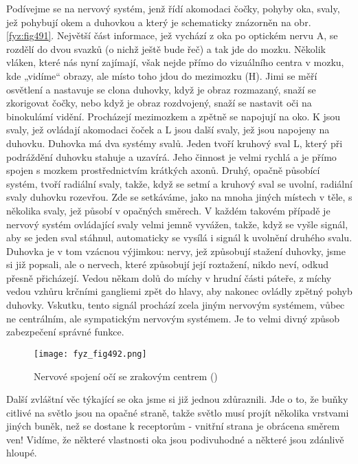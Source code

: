     Podívejme se na nervový systém, jenž řídí akomodaci čočky, pohyby oka, svaly, jež pohybují okem
    a duhovkou a který je schematicky znázorněn na obr. \ref{fyz:fig491}. Největší část informace,
    jež vychází z oka po optickém nervu A, se rozdělí do dvou svazků (o nichž ještě bude řeč) a tak
    jde do mozku. Několik vláken, které nás nyní zajímají, však nejde přímo do vizuálního centra v
    mozku, kde „vidíme“ obrazy, ale místo toho jdou do mezimozku (H). Jimi se měří osvětlení a
    nastavuje se clona duhovky, když je obraz rozmazaný, snaží se zkorigovat čočky, nebo když je
    obraz rozdvojený, snaží se nastavit oči na binokulámí vidění. Procházejí mezimozkem a zpětně se
    napojují na oko. K jsou svaly, jež ovládají akomodaci čoček a L jsou další svaly, jež jsou
    napojeny na duhovku. Duhovka má dva systémy svalů. Jeden tvoří kruhový sval L, který při
    podráždění duhovku stahuje a uzavírá. Jeho činnost je velmi rychlá a je přímo spojen s mozkem
    prostřednictvím krátkých axonů. Druhý, opačně působící systém, tvoří radiální svaly, takže, když
    se setmí a kruhový sval se uvolní, radiální svaly duhovku rozevřou. Zde se setkáváme, jako na
    mnoha jiných místech v těle, s několika svaly, jež působí v opačných směrech. V každém takovém
    případě je nervový systém ovládající svaly velmi jemně vyvážen, takže, když se vyšle signál, aby
    se jeden sval stáhnul, automaticky se vysílá i signál k uvolnění druhého svalu. Duhovka je v tom
    vzácnou výjimkou: nervy, jež způsobují stažení duhovky, jsme si již popsali, ale o nervech,
    které způsobují její roztažení, nikdo neví, odkud přesně přicházejí. Vedou někam dolů do míchy v
    hrudní části páteře, z míchy vedou vzhůru krčními gangliemi zpět do hlavy, aby nakonec ovládly
    zpětný pohyb duhovky. Vskutku, tento signál prochází zcela jiným nervovým systémem, vůbec ne
    centrálním, ale sympatickým nervovým systémem. Je to velmi divný způsob zabezpečení správné
    funkce.
    
    \begin{figure}[ht!] %
      \centering
      \texttt{[image: fyz\_fig492.png]}
      \caption{Nervové spojení očí se zrakovým centrem (\cite[s.~697]{Feynman01})}
      \label{fyz:fig492}
    \end{figure}

    Další zvláštní věc týkající se oka jsme si již jednou zdůraznili. Jde o to, že buňky citlivé na
    světlo jsou na opačné straně, takže světlo musí projít několika vrstvami jiných buněk, než se
    dostane k receptorům - vnitřní strana je obrácena směrem ven! Vidíme, že některé vlastnosti oka
    jsou podivuhodné a některé jsou zdánlivě hloupé.

